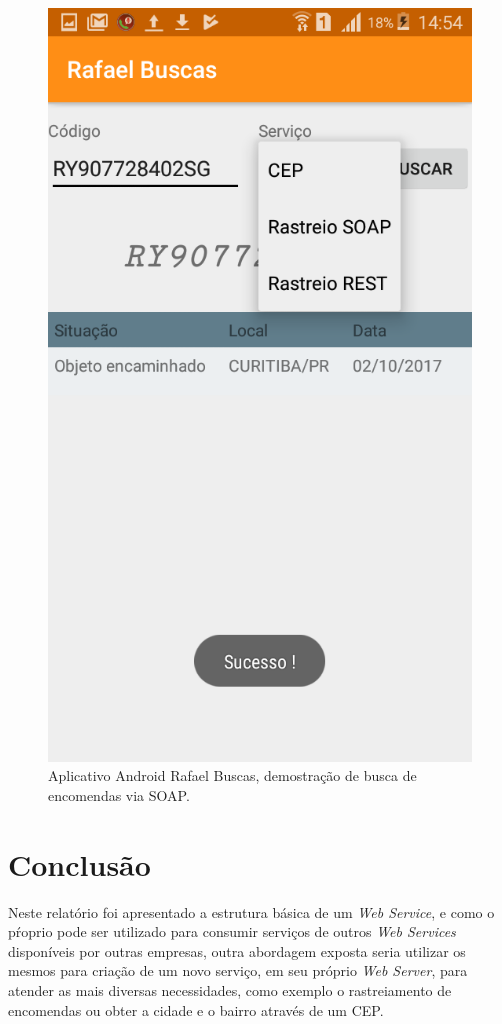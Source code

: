 \documentclass[journal]{IEEEtran}
\begin{document}
\begin{figure}[H]
	\centering
	\includegraphics[scale=0.2]{Imagens/android.png}
	\caption{Aplicativo Android Rafael Buscas, demostração de busca de encomendas via SOAP.}
	\label{and}
\end{figure}

\section{Conclusão}
Neste relatório foi apresentado a estrutura básica de um \textit{Web Service}, e como o pŕoprio pode ser utilizado para consumir serviços de outros \textit{Web Services} disponíveis por outras empresas, outra abordagem exposta seria utilizar os mesmos para criação de um novo serviço, em seu próprio \textit{Web Server}, para atender as mais diversas necessidades, como exemplo o rastreiamento de encomendas ou obter a cidade e o bairro através de um CEP.	  	


\end{document}
